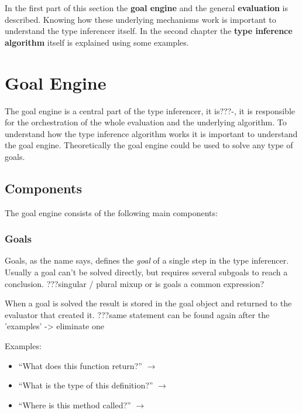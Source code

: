 \documentclass[12pt,halfparskip,DIV11,BCOR10mm]{scrreprt}
\begin{document}
In the first part of this section the \textbf{goal engine} and the general \textbf{evaluation} is described. Knowing how these underlying mechanisms work is important to understand the type inferencer itself. In the second chapter the \textbf{type inference algorithm} itself is explained using some examples. 

\section{Goal Engine}


The goal engine is a central part of the type inferencer, it is???-, it is responsible for the orchestration of the whole evaluation and the underlying algorithm. To understand how the type inference algorithm works it is important to understand the goal engine. Theoretically the goal engine could be used to solve any type of goals.

\subsection{Components}

The goal engine consists of the following main components:

\subsubsection{Goals}

Goals, as the name says, defines the \emph{goal} of a single step in the type inferencer. Usually a goal can't be solved directly, but requires several subgoals to reach a conclusion. ???singular / plural mixup or is goals a common expression?

When a goal is solved the result is stored in the goal object and returned to the evaluator that created it. ???same statement can be found again after the 'examples' -> eliminate one

Examples:

\begin{itemize}
    \item ``What does this function return?''  $\rightarrow$  
    \item ``What is the type of this definition?'' $\rightarrow$ 
    \item ``Where is this method called?'' $\rightarrow$ 
\end{itemize}
\end{document}

